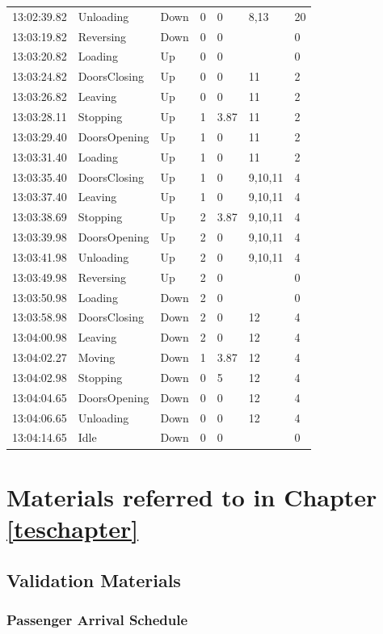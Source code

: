 \documentclass{UoYCSproject}
\begin{document}
\begin{longtable}{l | l | l | l | l | l | l}
	13:02:39.82 & Unloading & Down & 0 & 0 & 8,13 & 20 \\
	13:03:19.82 & Reversing & Down & 0 & 0 &  & 0 \\
	13:03:20.82 & Loading & Up & 0 & 0 &  & 0 \\
	13:03:24.82 & DoorsClosing & Up & 0 & 0 & 11 & 2 \\
	13:03:26.82 & Leaving & Up & 0 & 0 & 11 & 2 \\
	13:03:28.11 & Stopping & Up & 1 & 3.87 & 11 & 2 \\
	13:03:29.40 & DoorsOpening & Up & 1 & 0 & 11 & 2 \\
	13:03:31.40 & Loading & Up & 1 & 0 & 11 & 2 \\
	13:03:35.40 & DoorsClosing & Up & 1 & 0 & 9,10,11 & 4 \\
	13:03:37.40 & Leaving & Up & 1 & 0 & 9,10,11 & 4 \\
	13:03:38.69 & Stopping & Up & 2 & 3.87 & 9,10,11 & 4 \\
	13:03:39.98 & DoorsOpening & Up & 2 & 0 & 9,10,11 & 4 \\
	13:03:41.98 & Unloading & Up & 2 & 0 & 9,10,11 & 4 \\
	13:03:49.98 & Reversing & Up & 2 & 0 &  & 0 \\
	13:03:50.98 & Loading & Down & 2 & 0 &  & 0 \\
	13:03:58.98 & DoorsClosing & Down & 2 & 0 & 12 & 4 \\
	13:04:00.98 & Leaving & Down & 2 & 0 & 12 & 4 \\
	13:04:02.27 & Moving & Down & 1 & 3.87 & 12 & 4 \\
	13:04:02.98 & Stopping & Down & 0 & 5 & 12 & 4 \\
	13:04:04.65 & DoorsOpening & Down & 0 & 0 & 12 & 4 \\
	13:04:06.65 & Unloading & Down & 0 & 0 & 12 & 4 \\
	13:04:14.65 & Idle & Down & 0 & 0 &  & 0
\end{longtable}

\chapter{Materials referred to in Chapter \ref{teschapter}}

\section{Validation Materials}

\subsection{Passenger Arrival Schedule}
\end{document}

